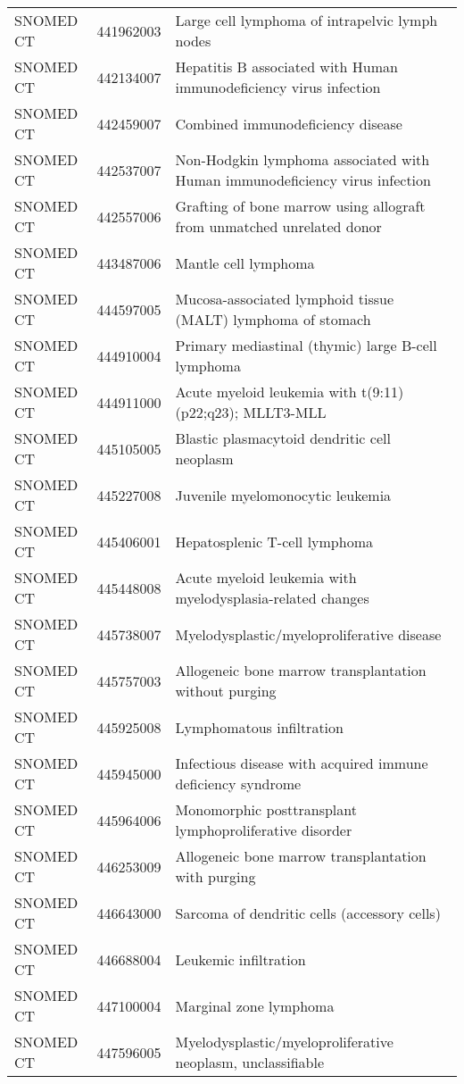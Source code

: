\begin{table}[ht]
\begin{tabular}{lll}
  SNOMED CT & 441962003 & Large cell lymphoma of intrapelvic lymph nodes \\ 
  SNOMED CT & 442134007 & Hepatitis B associated with Human immunodeficiency virus infection \\ 
  SNOMED CT & 442459007 & Combined immunodeficiency disease \\ 
  SNOMED CT & 442537007 & Non-Hodgkin lymphoma associated with Human immunodeficiency virus infection \\ 
  SNOMED CT & 442557006 & Grafting of bone marrow using allograft from unmatched unrelated donor \\ 
  SNOMED CT & 443487006 & Mantle cell lymphoma \\ 
  SNOMED CT & 444597005 & Mucosa-associated lymphoid tissue (MALT) lymphoma of stomach \\ 
  SNOMED CT & 444910004 & Primary mediastinal (thymic) large B-cell lymphoma \\ 
  SNOMED CT & 444911000 & Acute myeloid leukemia with t(9:11)(p22;q23); MLLT3-MLL \\ 
  SNOMED CT & 445105005 & Blastic plasmacytoid dendritic cell neoplasm \\ 
  SNOMED CT & 445227008 & Juvenile myelomonocytic leukemia \\ 
  SNOMED CT & 445406001 & Hepatosplenic T-cell lymphoma \\ 
  SNOMED CT & 445448008 & Acute myeloid leukemia with myelodysplasia-related changes \\ 
  SNOMED CT & 445738007 & Myelodysplastic/myeloproliferative disease \\ 
  SNOMED CT & 445757003 & Allogeneic bone marrow transplantation without purging \\ 
  SNOMED CT & 445925008 & Lymphomatous infiltration \\ 
  SNOMED CT & 445945000 & Infectious disease with acquired immune deficiency syndrome \\ 
  SNOMED CT & 445964006 & Monomorphic posttransplant lymphoproliferative disorder \\ 
  SNOMED CT & 446253009 & Allogeneic bone marrow transplantation with purging \\ 
  SNOMED CT & 446643000 & Sarcoma of dendritic cells (accessory cells) \\ 
  SNOMED CT & 446688004 & Leukemic infiltration \\ 
  SNOMED CT & 447100004 & Marginal zone lymphoma \\ 
  SNOMED CT & 447596005 & Myelodysplastic/myeloproliferative neoplasm, unclassifiable \\ 

\end{tabular}
\end{table}
